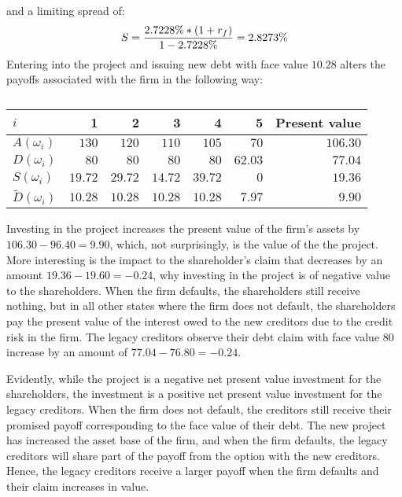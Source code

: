 \documentclass[main.tex]{subfiles}
\begin{document}
        and a limiting spread of:
        \begin{equation}
            S 
            = \frac{
                2.7228\% * (1 + r_{f})
            }{
                1 - 2.7228\%
            } 
            = 2.8273\%
        \end{equation}
        Entering into the project and issuing new debt with face value $10.28$ 
        alters the payoffs associated with the firm in the following way:
        \begin{table}[H]
            \centering
            \begin{tabular}{l|rrrrr||r}
                $i$ & 1 & 2 & 3 & 4 & 5 & Present value \\
                \hline
                $A(\omega_{i})$ & $130$ & $120$ & $110$ & $105$ & $70$ & $106.30$ \\
                $D(\omega_{i})$ & $80$ & $80$ & $80$ & $80$ & $62.03$ & $77.04$ \\
                $S(\omega_{i})$ & $19.72$ & $29.72$ & $14.72$ & $39.72$ & $0$ & $19.36$ \\
                $\tilde{D}(\omega_{i})$ & $10.28$ & $10.28$ & $10.28$ & $10.28$ & $7.97$ & $9.90$ \\
            \end{tabular}
            \caption{}
        \end{table}

        Investing in the project increases the present value of the firm's assets by $106.30 - 96.40 = 9.90$, 
        which, not surprisingly, is the value of the the project.
        More interesting is the impact to the shareholder's claim that decreases by an amount $19.36 - 19.60 = -0.24$, 
        why investing in the project is of negative value to the shareholders.
        When the firm defaults, the shareholders still receive nothing, 
        but in all other states where the firm does not default, 
        the shareholders pay the present value of the interest owed to the new creditors 
        due to the credit risk in the firm.
        The legacy creditors observe their debt claim with face value $80$ increase by an amount of
        $77.04 - 76.80 = -0.24$.

        Evidently, while the project is a negative net present value investment for the shareholders,
        the investment is a positive net present value investment for the legacy creditors.
        When the firm does not default, the creditors still receive their promised payoff 
        corresponding to the face value of their debt.
        The new project has increased the asset base of the firm, and when the firm defaults, 
        the legacy creditors will share part of the payoff from the option with the new creditors.
        Hence, the legacy creditors receive a larger payoff when the firm defaults and their claim increases in value. 
\end{document}
